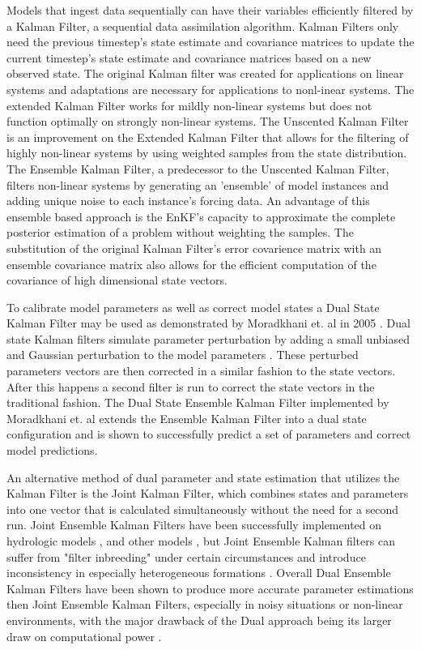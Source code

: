 	Models that ingest data sequentially can have their variables efficiently filtered by a Kalman Filter, a sequential data assimilation algorithm. Kalman Filters only need the previous timestep's state estimate and covariance matrices to update the current timestep's state estimate and covariance matrices based on a new observed state. The original Kalman filter\cite{Kalman1960} was created for applications on linear systems and adaptations are necessary for applications to nonl-inear systems. The extended Kalman Filter\cite{Jazwinski1970} works for mildly non-linear systems but does not function optimally on strongly non-linear systems\cite{Miller1994}. The Unscented Kalman Filter\cite{Julier1997} is an improvement on the Extended Kalman Filter that allows for the filtering of highly non-linear systems by using weighted samples from the state distribution. The Ensemble Kalman Filter\cite{Evensen1994}, a predecessor to the Unscented Kalman Filter, filters non-linear systems by generating an 'ensemble' of model instances and adding unique noise to each instance's forcing data. An advantage of this ensemble based approach is the EnKF's capacity to approximate the complete posterior estimation of a problem without weighting the samples.  The substitution of the original Kalman Filter's error covarience matrix with an ensemble covariance matrix also allows for the efficient computation of the covariance of high dimensional state vectors.
	
	To calibrate model parameters as well as correct model states a Dual State Kalman Filter may be used as demonstrated by Moradkhani et. al in 2005 \cite{Moradkhani2005}. Dual state Kalman filters simulate parameter perturbation by adding a small unbiased and Gaussian perturbation to the model parameters . These perturbed parameters vectors are then corrected in a similar fashion to the state vectors. After this happens a second filter is run to correct the state vectors in the traditional fashion. The Dual State Ensemble Kalman Filter implemented by Moradkhani et. al\cite{Moradkhani2005} extends the Ensemble Kalman Filter into a dual state configuration and is shown to successfully predict a set of parameters and correct model predictions.
	
	An alternative method of dual parameter and state estimation that utilizes the Kalman Filter is the Joint Kalman Filter, which combines states and parameters into one vector that is calculated simultaneously without the need for a second run. Joint Ensemble Kalman Filters have been successfully implemented on hydrologic models \cite{Vrugt2005}, \cite{Xiong2019} and other models \cite{Chen2008}, but Joint Ensemble Kalman filters can suffer from "filter inbreeding" under certain circumstances \cite{HendricksFranssen2008} and introduce inconsistency in especially heterogeneous formations \cite{Wen2006}. Overall Dual Ensemble Kalman Filters have been shown to produce more accurate parameter estimations then Joint Ensemble Kalman Filters, especially in noisy situations or non-linear environments, with the major drawback of the Dual approach being its larger draw on computational power \cite{Mariani2005}.

